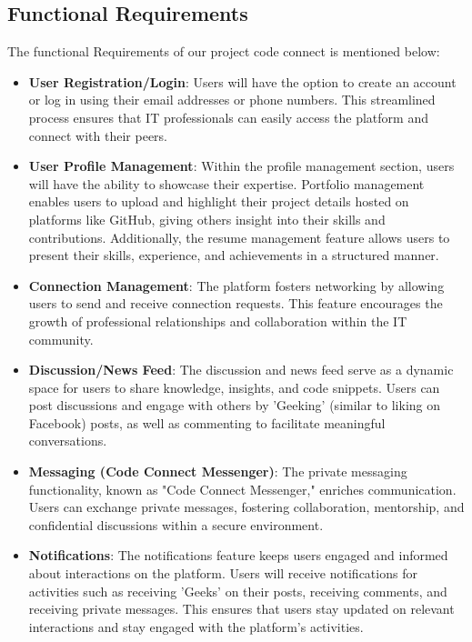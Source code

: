 \subsection{Functional Requirements}
The functional Requirements of our project code connect is mentioned below:
\begin{itemize}
    \item \textbf{User Registration/Login}:
      Users will have the option to create an account or log in using their email addresses or phone numbers. This streamlined process ensures that IT professionals can easily access the platform and connect with their peers.
    \item \textbf{User Profile Management}:
      Within the profile management section, users will have the ability to showcase their expertise. Portfolio management enables users to upload and highlight their project details hosted on platforms like GitHub, giving others insight into their skills and contributions. Additionally, the resume management feature allows users to present their skills, experience, and achievements in a structured manner.
    \item \textbf{Connection Management}:
      The platform fosters networking by allowing users to send and receive connection requests. This feature encourages the growth of professional relationships and collaboration within the IT community.
    \item \textbf{Discussion/News Feed}:
      The discussion and news feed serve as a dynamic space for users to share knowledge, insights, and code snippets. Users can post discussions and engage with others by 'Geeking' (similar to liking on Facebook) posts, as well as commenting to facilitate meaningful conversations.
    \item \textbf{Messaging (Code Connect Messenger)}:
      The private messaging functionality, known as "Code Connect Messenger," enriches communication. Users can exchange private messages, fostering collaboration, mentorship, and confidential discussions within a secure environment.
    \item \textbf{Notifications}:
      The notifications feature keeps users engaged and informed about interactions on the platform. Users will receive notifications for activities such as receiving 'Geeks' on their posts, receiving comments, and receiving private messages. This ensures that users stay updated on relevant interactions and stay engaged with the platform's activities.
    
  \end{itemize}
